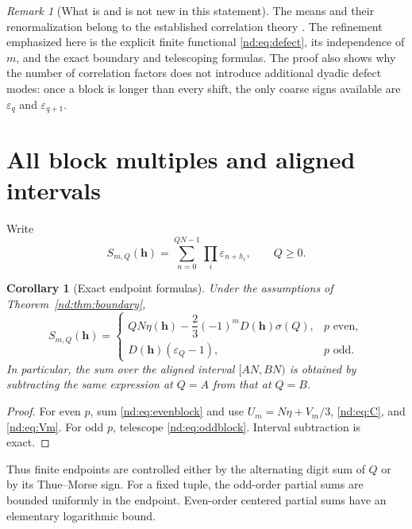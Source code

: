 \documentclass[11pt,a4paper,oneside,openany]{book}
\numberwithin{equation}{chapter}
\newtheorem{corollary}[theorem]{Corollary}
\theoremstyle{definition}
\theoremstyle{remark}
\newtheorem{remark}[theorem]{Remark}
\newcommand{\eps}{\varepsilon}
\begin{document}
\begin{remark}[What is and is not new in this statement]
The means and their renormalization belong to the established correlation
theory \cite{baake-coons}. The refinement emphasized here is the explicit finite
functional \eqref{nd:eq:defect}, its independence of \(m\), and the exact boundary
and telescoping formulas. The proof also shows why the number of correlation
factors does not introduce additional dyadic defect modes: once a block is
longer than every shift, the only coarse signs available are \(\eps_q\) and
\(\eps_{q+1}\).
\end{remark}

\section{All block multiples and aligned intervals}
Write
\[
 S_{m,Q}(\bm h)=\sum_{n=0}^{QN-1}\prod_i\eps_{n+h_i},\qquad Q\ge0.
\]

\begin{corollary}[Exact endpoint formulas]
\label{nd:cor:blockmultiples}
Under the assumptions of Theorem~\ref{nd:thm:boundary},
\begin{equation}
 S_{m,Q}(\bm h)=
 \begin{cases}
 QN\eta(\bm h)-\dfrac23(-1)^mD(\bm h)\sigma(Q),&p\text{ even},\\[2mm]
 D(\bm h)(\eps_Q-1),&p\text{ odd}.
 \end{cases}
 \label{nd:eq:allblocks}
\end{equation}
In particular, the sum over the aligned interval \([AN,BN)\) is obtained by
subtracting the same expression at \(Q=A\) from that at \(Q=B\).
\end{corollary}
\begin{proof}
For even \(p\), sum \eqref{nd:eq:evenblock} and use
\(U_m=N\eta+V_m/3\), \eqref{nd:eq:C}, and \eqref{nd:eq:Vm}.
For odd \(p\), telescope \eqref{nd:eq:oddblock}. Interval subtraction is exact.
\end{proof}

Thus finite endpoints are controlled either by the alternating digit sum of
\(Q\) or by its Thue--Morse sign. For a fixed tuple, the odd-order partial sums
are bounded uniformly in the endpoint. Even-order centered partial sums have
an elementary logarithmic bound.
\end{document}
